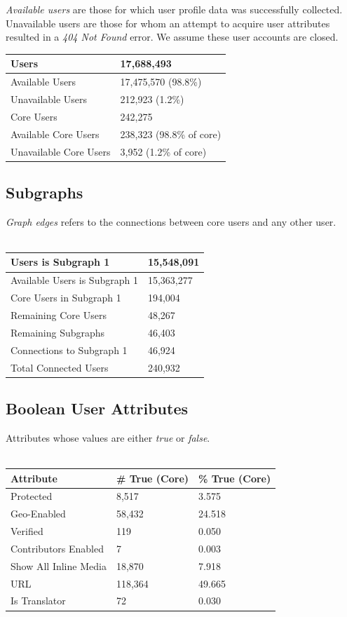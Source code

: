 
\textit{Available users} are those for which user profile data was successfully collected.  Unavailable users are those for whom an attempt to acquire user attributes resulted in a \textit{404 Not Found} error.  We assume these user accounts are closed.\\ 
\begin{tabular}[t]{| l | l |}
\hline
Users & 17,688,493  \\ \hline
Available Users & 17,475,570 (98.8\%) \\ \hline
Unavailable Users & 212,923 (1.2\%) \\ \hline
Core Users & 242,275 \\ \hline
Available Core Users & 238,323 (98.8\% of core) \\ \hline
Unavailable Core Users & 3,952 (1.2\% of core) \\ \hline
\end{tabular}

\subsection{Subgraphs}
\textit{Graph edges} refers to the connections between core users and any other user.\\\\
\begin{tabular}{| l | l | }
\hline
Users is Subgraph 1 & 15,548,091 \\ \hline
Available Users is Subgraph 1 & 15,363,277 \\ \hline
Core Users in Subgraph 1  & 194,004 \\ \hline
Remaining Core Users  & 48,267 \\ \hline
Remaining Subgraphs  & 46,403 \\ \hline
Connections to Subgraph 1  & 46,924 \\ \hline
Total Connected Users & 240,932 \\ \hline
\end{tabular}

\subsection{Boolean User Attributes}
Attributes whose values are either \textit{true} or \textit{false}.\\\\
\begin{tabular}{| l | l | l |}
\hline
\textbf{Attribute} & \textbf{\# True (Core)} & \textbf{\% True (Core)} \\ \hline
Protected & 8,517 & 3.575  \\ \hline
Geo-Enabled & 58,432 & 24.518 \\ \hline
Verified & 119 & 0.050 \\ \hline
Contributors Enabled & 7 & 0.003 \\ \hline
Show All Inline Media & 18,870 & 7.918 \\ \hline
URL & 118,364 & 49.665 \\ \hline
Is Translator & 72 & 0.030 \\ \hline
\end{tabular}

